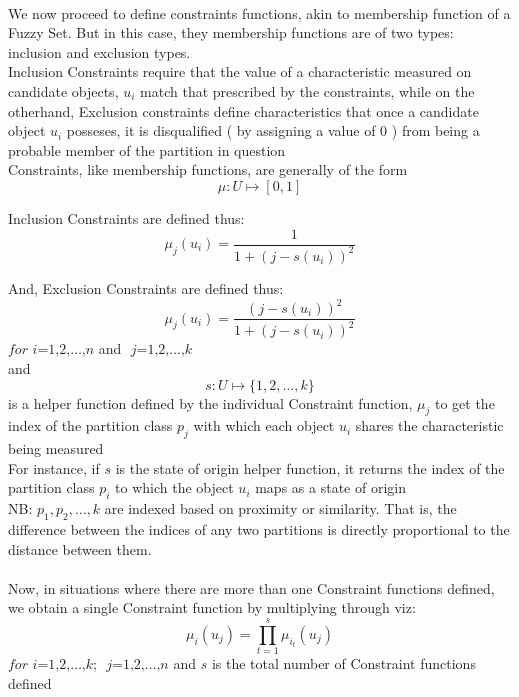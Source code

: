 \documentclass[a4paper,openany]{book}
\begin{document}
			\paragraph{}
				We now proceed to define constraints functions, akin to membership function of a Fuzzy Set. But in this case, they membership functions are of two types: inclusion and exclusion types.\\
				Inclusion Constraints require that the value of a characteristic measured on candidate objects, $u_i$ match that prescribed by the constraints, while on the otherhand, Exclusion constraints define characteristics that once a candidate object $u_i$ posseses, it is disqualified ( by assigning a value of 0 ) from being a probable member of the partition in question\\
				Constraints, like membership functions, are generally of the form
				\[
					\mu \colon U \mapsto [ 0,1 ]
				\]
				
				Inclusion Constraints are defined thus:
				\begin{equation}
					\mu_j(u_i) = \frac{1}{1+\left( j - s(u_i) \right)^2}
				\end{equation}
				
				And, Exclusion Constraints are defined thus:
				\begin{equation}
					\mu_j(u_i) = \frac{\left( j - s(u_i) \right)^2}{1+\left( j - s(u_i) \right)^2}
				\end{equation}
				$\textit{for i=1,2,}\dots\text{,}n$ and $\textit{ j=1,2,}\dots\text{,}k$\\
				and
				\begin{equation}
					s\colon U\mapsto \{ 1,2,\dots,k \}
				\end{equation}
				is a helper function defined by the individual Constraint function, $\mu_j$ to get the index of the partition class $p_j$ with which each object $u_i$ shares the characteristic being measured\\
				For instance, if $s$ is the state of origin helper function, it returns the index of the partition class $p_i$ to which the object $u_i$ maps as a state of origin\\
				NB: $p_1, p_2,\dots,k$ are indexed based on proximity or similarity. That is, the difference between the indices of any two partitions is directly proportional to the distance between them.
			\paragraph{}
				Now, in situations where there are more than one Constraint functions defined, we obtain a single Constraint function by multiplying through viz:
				\begin{equation}
					\mu_i(u_j) = \prod_{t=1}^{s}{\mu_{i_t}(u_j)}
				\end{equation}
				$\textit{for i=1,2,}\dots\text{,}k$; $\textit{ j=1,2,}\dots\text{,}n$ and $s$ is the total number of Constraint functions defined
\end{document}
